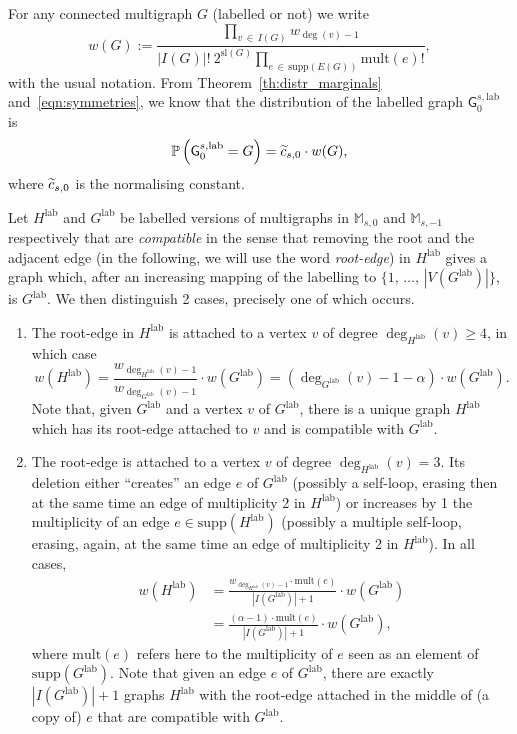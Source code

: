 \documentclass[10pt]{amsart}
\theoremstyle{definition}\newtheorem{defi}[theo]{Definition}\newtheorem{rema}[theo]{Remark}\newtheorem{exam}[theo]{Example}\newtheorem{exem}[theo]{Example}\newtheorem{nota}[theo]{Notation}
\newcommand{\supp}{\mathrm{supp}}
\newcommand{\sll}{\mathrm{sl}}
\newcommand{\lab}{\mathrm{lab}}
\newcommand{\mult}{\mathrm{mult}}
\newcommand{\sG}{\mathsf{G}}
\newcommand{\M}{\mathbb{M}}
\newcommand{\bbP}{\mathbb{P}}
\newcommand*{\alphenumi}{\renewcommand*{\theenumi}{\alph{enumi}}}
\let\oldtilde\tilde
\renewcommand*{\tilde}[1]{\mathchoice{\widetilde{#1}}{\widetilde{#1}}{\oldtilde{#1}}{\oldtilde{#1}}}
\begin{document}
For any connected multigraph $G$ (labelled or not) we write
\[
w(G):=\frac{\prod\limits_{v\,\in\,I(G)} w_{\deg(v)-1}}{|I(G)|!~2^{\sll(G)}\prod\limits_{e\,\in\,\supp(E(G))}\mult(e)!},
\]
with the usual notation. From Theorem~\ref{th:distr_marginals} and~\eqref{eqn:symmetries}, we know that the distribution of the labelled graph $\sG_{0}^{s,\lab}$ is
\begin{equation}\label{eq:distretiq_0}
\bbP\left(\sG_{0}^{s,\lab}=G\right)=\tilde{c}_{s,0} \cdot w(G),
\end{equation}
where $\tilde{c}_{s,0}$ is the normalising constant.

Let $H^{\lab}$ and $G^{\lab}$ be labelled versions of multigraphs in $\M_{s,0}$ and $\M_{s,-1}$ respectively that are \emph{compatible} in the sense that removing the root and the adjacent edge (in the following, we will use the word \emph{root-edge}) in $H^{\lab}$ gives a graph which, after an increasing mapping of the labelling to $\{1,\,\ldots,\,|V(G^{\lab})|\}$, is $G^{\lab}$. We then distinguish 2 cases, precisely one of which occurs.
\begin{enumerate}\alphenumi
\item\label{sect3.5.case:a} The root-edge in $H^{\lab}$ is attached to a vertex $v$ of degree $\deg_{H^{\lab}}(v) \geq 4$, in which case
\[
w\left(H^{\lab}\right)=\frac{w_{\deg_{H^{\lab}}(v)-1}}{w_{\deg_{G^{\lab}}(v)-1}}\cdot w\left(G^{\lab}\right)=\left(\deg_{G^{\lab}}(v)-1-\alpha\right) \cdot w\left(G^{\lab}\right).
\]
Note that, given $G^{\lab}$ and a vertex $v$ of $G^{\lab}$, there is a unique graph $H^{\lab}$ which has its root-edge attached to $v$ and is compatible with $G^{\lab}$.
\item\label{sect3.5.case:b} The root-edge is attached to a vertex $v$ of degree $\deg_{H^{\lab}}(v) = 3$. Its deletion either ``creates'' an edge $e$ of $G^{\lab}$ (possibly a self-loop, erasing then at the same time an edge of multiplicity 2 in $H^{\lab}$) or increases by 1 the multiplicity of an edge $e \in \supp(H^{\lab})$ (possibly a multiple self-loop, erasing, again, at the same time an edge of multiplicity 2 in $H^{\lab}$). In all cases,
\begin{align*}
w\left(H^{\lab}\right)&=\frac{w_{\deg_{H^{\lab}}(v)-1} \cdot \mult(e)}{\left|I\left(G^{\lab}\right)\right|+1}\cdot w\left(G^{\lab}\right)\\
&=\frac{(\alpha-1)\cdot \mult(e)}{\left|I\left(G^{\lab}\right)\right|+1}\cdot w\left(G^{\lab}\right),
\end{align*}
where $\mult(e)$ refers here to the multiplicity of $e$ seen as an element of $\supp(G^{\lab})$. Note that given an edge $e$ of $G^{\lab}$, there are exactly $|I(G^{\lab})|+1$ graphs $H^{\lab}$ with the root-edge attached in the middle of (a copy of) $e$ that are compatible with $G^{\lab}$.
\end{enumerate}
\end{document}
